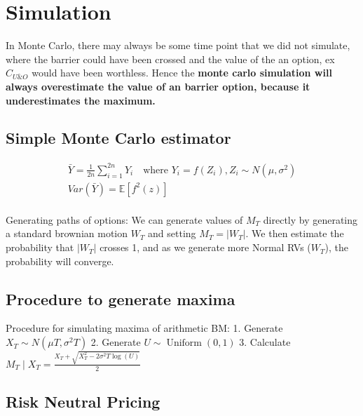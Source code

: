 \documentclass[
  oneside]{book}
\begin{document}
\hypertarget{simulation}{%
\section{Simulation}\label{simulation}}

In Monte Carlo, there may always be some time point that we did not simulate, where the barrier could have been crossed and the value of the an option, ex \(C_{U\&O}\) would have been worthless. Hence the \textbf{monte carlo simulation will always overestimate the value of an barrier option, because it underestimates the maximum.}

\hypertarget{simple-monte-carlo-estimator}{%
\subsection{Simple Monte Carlo estimator}\label{simple-monte-carlo-estimator}}

\[
\begin{gathered}
\bar{Y} = \frac{1}{2n}\sum^{2n}_{i=1} Y_{i}\quad \text{where } 
Y_{i} = f(Z_{i}), Z_{i} \sim N(\mu,\sigma^{2})\\
Var(\bar{Y}) = \mathbb{E}[f^{2}(z)]\\
\end{gathered}
\]

Generating paths of options:
We can generate values of \(M_{T}\) directly by generating a standard brownian motion \(W_{T}\) and setting \(M_{T} = |W_{T}|\). We then estimate the probability that \(|W_{T}|\) crosses 1, and as we generate more Normal RVs (\(W_{T}\)), the probability will converge.

\hypertarget{procedure-to-generate-maxima-1}{%
\subsection{Procedure to generate maxima}\label{procedure-to-generate-maxima-1}}

Procedure for simulating maxima of arithmetic BM:
1. Generate \(X_T \sim N\left(\mu T, \sigma^2 T\right)\)
2. Generate \(U \sim \operatorname{Uniform}(0,1)\)
3. Calculate \(M_T \mid X_T=\frac{X_T+\sqrt{X_T^2-2 \sigma^2 T \log (U)}}{2}\)

\hypertarget{risk-neutral-pricing-1}{%
\subsection{Risk Neutral Pricing}\label{risk-neutral-pricing-1}}
\end{document}

